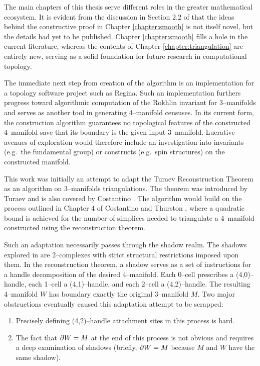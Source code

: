 \label{chapter:conclusion}

The main chapters of this thesis serve different roles in the greater mathematical ecosystem.
It is evident from the discussion in Section 2.2 of \cite{CostThur08} that the ideas behind the constructive proof in Chapter \ref{chapter:smooth} is not itself novel, but the details had yet to be published.
Chapter \ref{chapter:smooth} fills a hole in the current literature, whereas the contents of Chapter \ref{chapter:triangulation} are entirely new, serving as a solid foundation for future research in computational topology.

The immediate next step from creation of the algorithm is an implementation for a topology software project such as Regina.
Such an implementation furthers progress toward algorithmic computation of the Rokhlin invariant for 3--manifolds and serves as another tool in generating 4--manifold censuses.
In its current form, the construction algorithm guarantees no topological features of the constructed 4--manifold save that its boundary is the given input 3--manifold.
Lucrative avenues of exploration would therefore include an investigation into invariants (e.g.\ the fundamental group) or constructs (e.g.\ spin structures) on the constructed manifold.

This work was initially an attempt to adapt the Turaev Reconstruction Theorem as an algorithm on 3--manifolds triangulations.
The theorem was introduced by Turaev \cite{Turaev91} and is also covered by Costantino \cite{Cost05}.
The algorithm would build on the process outlined in Chapter 4 of Costantino and Thurston \cite{CostThur08}, where a quadratic bound is achieved for the number of simplices needed to triangulate a 4--manifold constructed using the reconstruction theorem.

Such an adaptation necessarily passes through the shadow realm.
The shadows explored in \cite{Turaev91} are 2--complexes with strict structural restrictions imposed upon them.
In the reconstruction theorem, a shadow serves as a set of instructions for a handle decomposition of the desired 4--manifold.
Each 0--cell prescribes a (4,0)--handle, each 1--cell a (4,1)--handle, and each 2--cell a (4,2)--handle.
The resulting 4--manifold $W$ has boundary exactly the original 3--manifold $M$.
Two major obstructions eventually caused this adaptation attempt to be scrapped:
\begin{enumerate}
	\item Precisely defining (4,2)--handle attachment sites in this process is hard.
	\item The fact that $\partial W = M$ at the end of this process is not obvious and requires a deep examination of shadows (briefly, $\partial W = M$ because $M$ and $W$ have the same shadow).
\end{enumerate}

